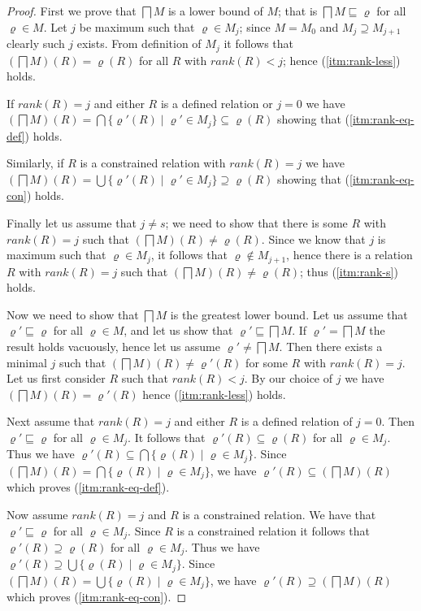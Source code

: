 \begin{proof}
  First we prove that $\bigsqcap M$ is a lower bound of $M$; that is
  $\bigsqcap M \sqsubseteq \varrho$ for all $\varrho \in M$. Let $j$
  be maximum such that $\varrho \in M_j$; since $M=M_0$ and $M_j
  \supseteq M_{j+1}$ clearly such $j$ exists. From definition of $M_j$
  it follows that $(\bigsqcap M)(R)=\varrho(R)$ for all $R$ with
  $rank(R)<j$; hence (\ref{itm:rank-less}) holds.

  \noindent If $rank(R)=j$ and either $R$ is a defined relation or
  $j=0$ we have $(\bigsqcap M)(R)= \bigcap \{ \varrho'(R) \mid
  \varrho' \in M_j \} \subseteq \varrho(R)$ showing that
  (\ref{itm:rank-eq-def}) holds.

  \noindent Similarly, if $R$ is a constrained relation with
  $rank(R)=j$ we have $(\bigsqcap M)(R)= \bigcup \{ \varrho'(R) \mid
  \varrho' \in M_j \} \supseteq \varrho(R)$ showing that
  (\ref{itm:rank-eq-con}) holds.

  \noindent Finally let us assume that $j \neq s$; we need to show
  that there is some $R$ with $rank(R)=j$ such that $(\bigsqcap
  M)(R)\neq\varrho(R)$. Since we know that $j$ is maximum such that
  $\varrho \in M_j$, it follows that $\varrho \notin M_{j+1}$, hence
  there is a relation $R$ with $rank(R)=j$ such that $(\bigsqcap
  M)(R)\neq\varrho(R)$; thus (\ref{itm:rank-s}) holds.

  \noindent Now we need to show that $\bigsqcap M$ is the greatest
  lower bound. Let us assume that $\varrho' \sqsubseteq \varrho$ for
  all $\varrho \in M$, and let us show that $\varrho' \sqsubseteq
  \bigsqcap M$. If $\varrho' = \bigsqcap M$ the result holds vacuously,
  hence let us assume $\varrho' \neq \bigsqcap M$. Then there exists a
  minimal $j$ such that $(\bigsqcap M)(R)\neq\varrho'(R)$ for some $R$
  with $rank(R)=j$. Let us first consider $R$ such that
  $rank(R)<j$. By our choice of $j$ we have $(\bigsqcap M)(R) =
  \varrho'(R)$ hence (\ref{itm:rank-less}) holds.

  \noindent Next assume that $rank(R)=j$ and either $R$ is a defined
  relation of $j=0$. Then $\varrho' \sqsubseteq \varrho$ for all
  $\varrho \in M_j$. It follows that $\varrho'(R) \subseteq
  \varrho(R)$ for all $\varrho \in M_j$. Thus we have $\varrho'(R)
  \subseteq \bigcap \{ \varrho(R) \mid \varrho \in M_j \}$. Since
  $(\bigsqcap M)(R) = \bigcap \{ \varrho(R) \mid \varrho \in M_j \}$,
  we have $\varrho'(R) \subseteq (\bigsqcap M)(R)$ which proves
  (\ref{itm:rank-eq-def}).

  \noindent Now assume $rank(R)=j$ and $R$ is a constrained
  relation. We have that $\varrho' \sqsubseteq \varrho$ for all
  $\varrho \in M_j$. Since $R$ is a constrained relation it follows
  that $\varrho'(R) \supseteq \varrho(R)$ for all $\varrho \in
  M_j$. Thus we have $\varrho'(R) \supseteq \bigcup \{ \varrho(R) \mid
  \varrho \in M_j \}$. Since $(\bigsqcap M)(R) = \bigcup \{ \varrho(R)
  \mid \varrho \in M_j \}$, we have $\varrho'(R) \supseteq (\bigsqcap
  M)(R)$ which proves (\ref{itm:rank-eq-con}).


\end{proof}
